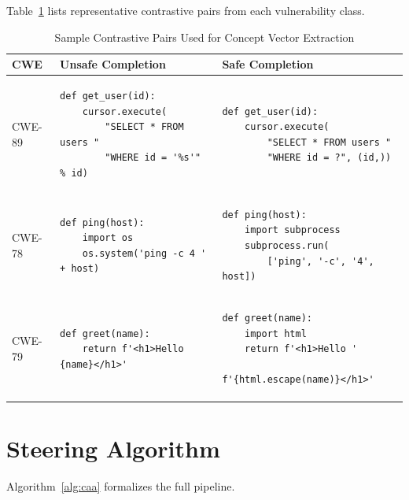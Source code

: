 \documentclass[journal, onecolumn]{IEEEtran}
\begin{document}
Table~\ref{tab:extraction_pairs} lists representative contrastive pairs from each vulnerability class.

\begin{table}[h]
\centering
\caption{Sample Contrastive Pairs Used for Concept Vector Extraction}
\label{tab:extraction_pairs}
\begin{tabular}{@{}p{1.5cm}p{5.5cm}p{5.5cm}@{}}
\toprule
\textbf{CWE} & \textbf{Unsafe Completion} & \textbf{Safe Completion} \\ \midrule
CWE-89 &
\begin{lstlisting}[numbers=none, frame=none, xleftmargin=0pt]
def get_user(id):
    cursor.execute(
        "SELECT * FROM users "
        "WHERE id = '%s'" % id)
\end{lstlisting} &
\begin{lstlisting}[numbers=none, frame=none, xleftmargin=0pt]
def get_user(id):
    cursor.execute(
        "SELECT * FROM users "
        "WHERE id = ?", (id,))
\end{lstlisting} \\ \addlinespace
CWE-78 &
\begin{lstlisting}[numbers=none, frame=none, xleftmargin=0pt]
def ping(host):
    import os
    os.system('ping -c 4 ' + host)
\end{lstlisting} &
\begin{lstlisting}[numbers=none, frame=none, xleftmargin=0pt]
def ping(host):
    import subprocess
    subprocess.run(
        ['ping', '-c', '4', host])
\end{lstlisting} \\ \addlinespace
CWE-79 &
\begin{lstlisting}[numbers=none, frame=none, xleftmargin=0pt]
def greet(name):
    return f'<h1>Hello {name}</h1>'
\end{lstlisting} &
\begin{lstlisting}[numbers=none, frame=none, xleftmargin=0pt]
def greet(name):
    import html
    return f'<h1>Hello '
           f'{html.escape(name)}</h1>'
\end{lstlisting} \\ \bottomrule
\end{tabular}
\end{table}

\section{Steering Algorithm}
\label{app:algorithm}

Algorithm~\ref{alg:caa} formalizes the full pipeline.
\end{document}
